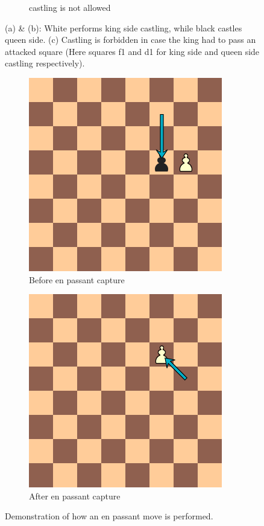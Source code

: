 \begin{figure}
\begin{subfigure}[b]{0.4\textwidth}
\caption{castling is not allowed}
\end{subfigure}
\caption[Castling]{(a) \& (b): White performs king side castling, while black castles queen side. (c) Castling is forbidden in case the king had to pass an attacked square (Here squares f1 and d1 for king side and queen side castling respectively).}
\label{fig:castle}
\end{figure}

\begin{figure}
\centering
\begin{subfigure}[b]{0.4\textwidth}
\includegraphics[scale=0.5]{fig/rules/ep_before}
\caption{Before en passant capture}
\label{fig:ep_bef}
\end{subfigure}
\qquad
\begin{subfigure}[b]{0.4\textwidth}
\includegraphics[scale=0.5]{fig/rules/ep_after}
\caption{After en passant capture}
\end{subfigure}
\caption[En passant capture]{Demonstration of how an en passant move is performed.}
\label{fig:ep}
\end{figure}

